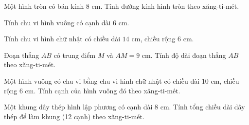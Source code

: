 \begin{ex} %
Một hình tròn có bán kính $8\text{ cm}$. Tính đường kính hình tròn theo xăng-ti-mét.
\end{ex}

\begin{ex} %
Tính chu vi hình vuông có cạnh dài $6\text{ cm}$.
\end{ex}

\begin{ex} %
Tính chu vi hình chữ nhật có chiều dài $14\text{ cm}$, chiều rộng $6\text{ cm}$.
\end{ex}

\begin{ex} %
Đoạn thẳng $AB$ có trung điểm $M$ và $AM = 9\text{ cm}$. Tính độ dài đoạn thẳng $AB$ theo xăng-ti-mét.
\end{ex}

\begin{ex} %
Một hình vuông có chu vi bằng chu vi hình chữ nhật có chiều dài $10\text{ cm}$, chiều rộng $6\text{ cm}$. Tính cạnh của hình vuông đó theo xăng-ti-mét.
\end{ex}

\begin{ex} %
Một khung dây thép hình lập phương có cạnh dài $8\text{ cm}$. Tính tổng chiều dài dây thép để làm khung (12 cạnh) theo xăng-ti-mét.
\end{ex}
